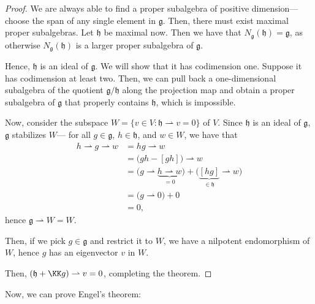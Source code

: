 \documentclass{article}
\newcommand{\lb}[1]{\ensuremath{\left[{#1}\right]}}
\newcommand{\frkg}{{\ensuremath{\mathfrak{g}}}}
\newcommand{\frkh}{{\ensuremath{\mathfrak{h}}}}
\begin{document}
\begin{proof}
    We are always able to find a proper subalgebra of positive dimension--- choose the span of any single element in $\frkg$. 
    Then, there must exist maximal proper subalgebras. 
    Let $\frkh$ be maximal now. 
    Then we have that $N_\frkg(\frkh) = \frkg$, as otherwise $N_\frkg(\frkh)$ is a larger proper subalgebra of $\frkg$.

    Hence, $\frkh$ is an ideal of $\frkg$.
    We will show that it has codimension one.
    Suppose it has codimension at least two.
    Then, we can pull back a one-dimensional subalgebra of the quotient $\frkg / \frkh$ along the projection map and obtain a proper subalgebra of $\frkg$ that properly contains $\frkh$, which is impossible.

    Now, consider the subspace $W = \{ v \in V : \frkh \rightharpoonup v = 0 \}$ of $V$.
    Since $\frkh$ is an ideal of $\frkg$, $\frkg$ stabilizes $W$--- for all $g \in \frkg$, $h \in \frkh$, and $w \in W$, we have that
    \begin{align*}
        h \rightharpoonup g \rightharpoonup w
        &=
        hg \rightharpoonup w
        \\
        &= 
        \Big(gh - \lb{gh}\Big) \rightharpoonup w
        \\
        &=
        \Big( g \rightharpoonup \underbrace{h \rightharpoonup w}_{=0} \Big) + \Big(\underbrace{\lb{hg}}_{\in \frkh} \rightharpoonup w\Big)
        \\
        &=
        \Big( g \rightharpoonup 0 \Big) + 0
        \\
        &=
        0,
    \end{align*}
    hence $\frkg \rightharpoonup W = W$.

    Then, if we pick $g \in \frkg$ and restrict it to $W$, we have a nilpotent endomorphism of $W$, hence $g$ has an eigenvector $v$ in $W$.

    Then, $(\frkh + \KK g) \rightharpoonup v = 0$, completing the theorem.
\end{proof}

Now, we can prove Engel's theorem:
\end{document}
